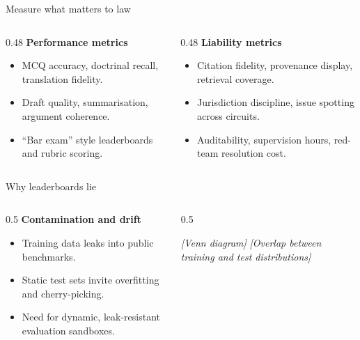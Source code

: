\documentclass[10pt, aspectratio=169]{beamer}
\newcommand{\placeholder}[1]{\textit{[#1]}}
\begin{document}
\begin{frame}{Measure what matters to law}
  \begin{columns}[T]
    \begin{column}{0.48\textwidth}
      \textbf{Performance metrics}
      \begin{itemize}
        \item MCQ accuracy, doctrinal recall, translation fidelity.
        \item Draft quality, summarisation, argument coherence.
        \item ``Bar exam'' style leaderboards and rubric scoring.
      \end{itemize}
    \end{column}
    \begin{column}{0.48\textwidth}
      \textbf{Liability metrics}
      \begin{itemize}
        \item Citation fidelity, provenance display, retrieval coverage.
        \item Jurisdiction discipline, issue spotting across circuits.
        \item Auditability, supervision hours, red-team resolution cost.
      \end{itemize}
    \end{column}
  \end{columns}
  \vfill
  \small \parencite{large_legal_fictions}
\end{frame}

\begin{frame}{Why leaderboards lie}
  \begin{columns}[T]
    \begin{column}{0.5\textwidth}
      \textbf{Contamination and drift}
      \begin{itemize}
        \item Training data leaks into public benchmarks.
        \item Static test sets invite overfitting and cherry-picking.
        \item Need for dynamic, leak-resistant evaluation sandboxes.
      \end{itemize}
    \end{column}
    \begin{column}{0.5\textwidth}
      \begin{block}{\placeholder{Venn diagram}}
        \centering
        \placeholder{Overlap between training and test distributions}
      \end{block}
    \end{column}
  \end{columns}
  \vfill
  \small \parencite{leak_cheat_repeat,contamination_forget}
\end{frame}
\end{document}
